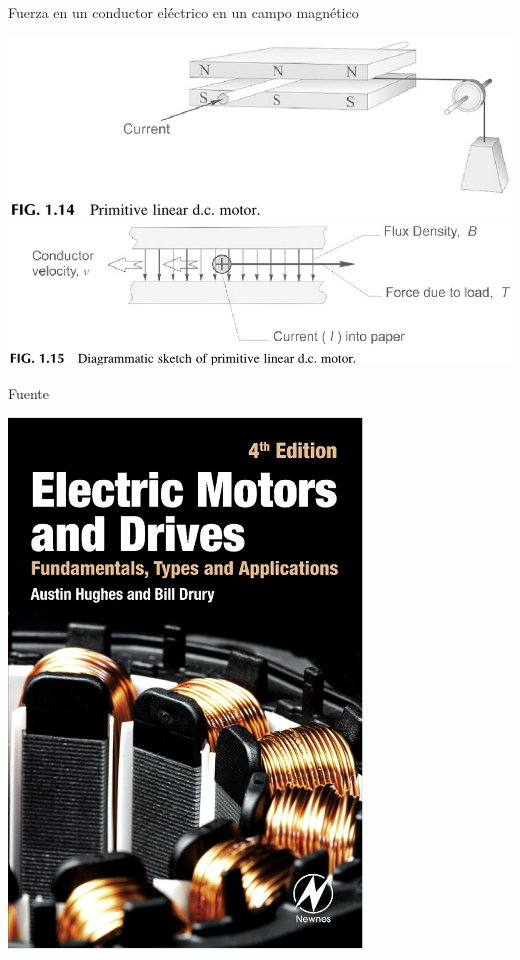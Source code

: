 \documentclass[presentation,aspectratio=169]{beamer}
\begin{document}
\begin{frame}[label={sec:org7c40f0d}]{Fuerza en un conductor eléctrico en un campo magnético}
\begin{center}
\includegraphics[width=0.4\linewidth]{../../figures/HD-fig1_14.png}
\includegraphics[width=0.53\linewidth]{../../figures/HD-fig1_15.png}
\end{center}


\begin{block}{Fuente}
\begin{center}
\includegraphics[width=0.2\linewidth]{../../figures/textbook.png}
\end{center}
\end{block}
\end{frame}
\end{document}
